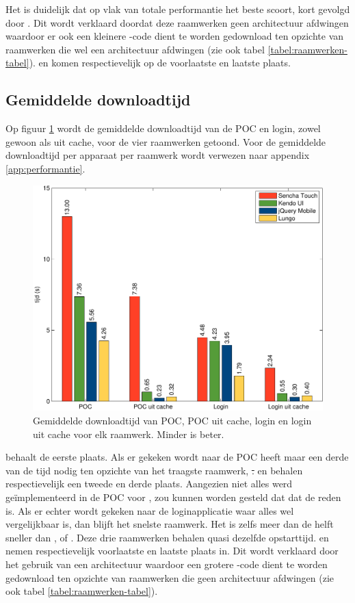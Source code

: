Het is duidelijk dat op vlak van totale performantie \jqm{} het beste scoort, kort gevolgd door \lungo{}.
Dit wordt verklaard doordat deze raamwerken geen architectuur afdwingen waardoor er ook een kleinere \js{}-code dient te worden gedownload ten opzichte van raamwerken die wel een architectuur afdwingen (zie ook tabel \ref{tabel:raamwerken-tabel}).
\kendo{} en \st{} komen respectievelijk op de voorlaatste en laatste plaats.


\subsection{Gemiddelde downloadtijd}
\label{sec:evaluatie-downloadtijd}

Op figuur \ref{fig:performantie} wordt de gemiddelde downloadtijd van de POC en login, zowel gewoon als uit cache, voor de vier raamwerken getoond.
Voor de gemiddelde downloadtijd per apparaat per raamwerk wordt verwezen naar appendix \ref{app:performantie}.

\begin{figure}[H]
  \centering
  \includegraphics[width=\textwidth]{figuren/performance.pdf}
  \caption{Gemiddelde downloadtijd van POC,  POC uit cache,  login en login uit cache voor elk raamwerk. Minder is beter.}
  \label{fig:performantie}
\end{figure}

\lungo{} behaalt de eerste plaats.
Als er gekeken wordt naar de POC heeft \lungo{} maar een derde van de tijd nodig ten opzichte van het traagste raamwerk, \st.
\jqm{} en \kendo{} behalen respectievelijk een tweede en derde plaats.
Aangezien niet alles werd geïmplementeerd in de POC voor \lungo{}, zou kunnen worden gesteld dat dat de reden is.
Als er echter wordt gekeken naar de loginapplicatie waar alles wel vergelijkbaar is, dan blijft \lungo{} het snelste raamwerk.
Het is zelfs meer dan de helft sneller dan \jqm{}, \kendo{} of \st{}.
Deze drie raamwerken behalen quasi dezelfde opstarttijd.
\kendo{} en \st{} nemen respectievelijk voorlaatste en laatste plaats in.
Dit wordt verklaard door het gebruik van een architectuur waardoor een grotere \js{}-code dient te worden gedownload ten opzichte van raamwerken die geen architectuur afdwingen (zie ook tabel \ref{tabel:raamwerken-tabel}).

